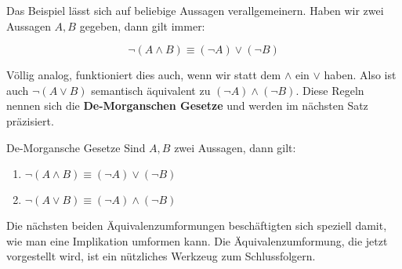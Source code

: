 \documentclass[../../main.tex]{subfiles}
\begin{document}
     Das Beispiel lässt sich auf beliebige Aussagen verallgemeinern. Haben wir zwei Aussagen $A,B$ gegeben, dann gilt immer:
     
     \[\lnot( A \land B) \equiv (\lnot A) \lor (\lnot B)\]
     
     Völlig analog, funktioniert dies auch, wenn wir statt dem $\land$ ein $\lor$ haben. Also ist auch $\lnot (A \lor B)$ semantisch äquivalent zu $(\lnot A) \land (\lnot B)$. Diese Regeln nennen sich die \textbf{De-Morganschen Gesetze} und werden im nächsten Satz präzisiert.
     
    \begin{lemma}{De-Morgansche Gesetze}
        Sind $A,B$ zwei Aussagen, dann gilt:
        \begin{enumerate}
            \item $\lnot( A \land B) \equiv (\lnot A) \lor (\lnot B)$
            \item $\lnot( A \lor B) \equiv (\lnot A) \land (\lnot B)$
        \end{enumerate}
    \end{lemma}
    
    Die nächsten beiden Äquivalenzumformungen beschäftigten sich speziell damit, wie man eine Implikation umformen kann.
    Die Äquivalenzumformung, die jetzt vorgestellt wird, ist ein nützliches Werkzeug zum Schlussfolgern.
    
\end{document}
